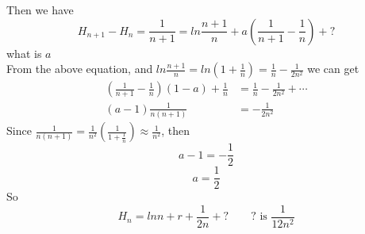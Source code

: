 \documentclass[11pt]{article}
\begin{document}
Then we have\\
\[
H_{n+1}-H_n=\frac{1}{n+1}=ln\frac{n+1}{n}+a(\frac{1}{n+1}-\frac{1}{n})+?
\]
what is \(a\) \\
From the above equation, and
\(ln\frac{n+1}{n}=ln(1+\frac{1}{n})=\frac{1}{n}-\frac{1}{2n^2}\) we can get
\begin{align*}
(\frac{1}{n+1}-\frac{1}{n})(1-a)+\frac{1}{n}&=\frac{1}{n}-\frac{1}{2n^2}+\cdots
\\
(a-1)\frac{1}{n(n+1)}&=-\frac{1}{2n^2}
\end{align*}
Since
\(\frac{1}{n(n+1)}=\frac{1}{n^2}\left(\frac{1}{1+\frac{1}{n}}\right)\approx\frac{1}{n^2}\),
then \\
\[
a-1=-\frac{1}{2}
\]
\[
a=\frac{1}{2}
\]
So \\
\[
H_n=lnn+r+\frac{1}{2n}+?\qquad ?\text{ is }\frac{1}{12n^2}
\]
\end{document}
